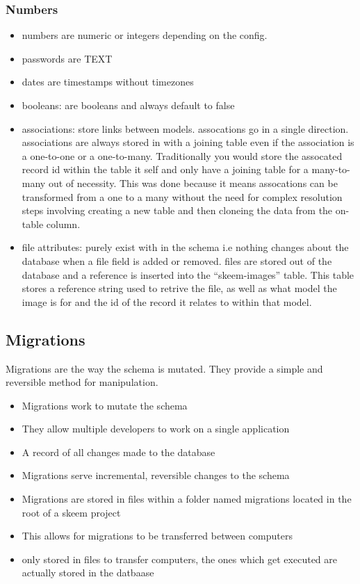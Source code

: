 \documentclass[
  12pt,
]{article}
\begin{document}
\hypertarget{numbers-1}{%
\subsubsection{Numbers}\label{numbers-1}}

\begin{itemize}
\item
  numbers are numeric or integers depending on the config.
\item
  passwords are TEXT
\item
  dates are timestamps without timezones
\item
  booleans: are booleans and always default to false
\item
  associations: store links between models. assocations go in a single
  direction. associations are always stored in with a joining table even
  if the association is a one-to-one or a one-to-many. Traditionally you
  would store the assocated record id within the table it self and only
  have a joining table for a many-to-many out of necessity. This was
  done because it means assocations can be transformed from a one to a
  many without the need for complex resolution steps involving creating
  a new table and then cloneing the data from the on-table column.
\item
  file attributes: purely exist with in the schema i.e nothing changes
  about the database when a file field is added or removed. files are
  stored out of the database and a reference is inserted into the
  ``skeem-images'' table. This table stores a reference string used to
  retrive the file, as well as what model the image is for and the id of
  the record it relates to within that model.
\end{itemize}

\hypertarget{migrations}{%
\subsection{Migrations}\label{migrations}}

Migrations are the way the schema is mutated. They provide a simple and
reversible method for manipulation.

\begin{itemize}
\item
  Migrations work to mutate the schema
\item
  They allow multiple developers to work on a single application
\item
  A record of all changes made to the database
\item
  Migrations serve incremental, reversible changes to the schema
\item
  Migrations are stored in files within a folder named migrations
  located in the root of a skeem project
\item
  This allows for migrations to be transferred between computers
\item
  only stored in files to transfer computers, the ones which get
  executed are actually stored in the datbaase
\end{itemize}
\end{document}
